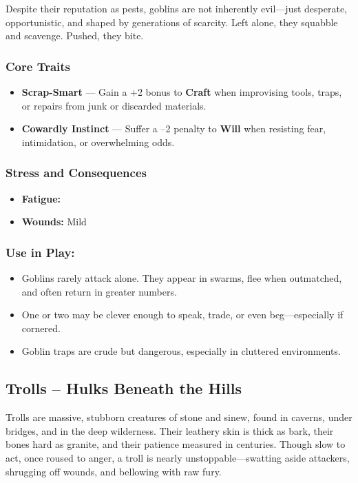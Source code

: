Despite their reputation as pests, goblins are not inherently evil—just desperate, opportunistic, and shaped by generations of scarcity. Left alone, they squabble and scavenge. Pushed, they bite.

\subsubsection*{Core Traits}
\begin{itemize}
  \item \textbf{Scrap-Smart} — Gain a +2 bonus to \textbf{Craft} when improvising tools, traps, or repairs from junk or discarded materials.

  \item \textbf{Cowardly Instinct} — Suffer a –2 penalty to \textbf{Will} when resisting fear, intimidation, or overwhelming odds.
\end{itemize}

\subsubsection*{Stress and Consequences}
\begin{itemize}
  \item \textbf{Fatigue:} \FatigueBox\FatigueBox
  \item \textbf{Wounds:} Mild \MildWound\MildWound
\end{itemize}

\subsubsection*{Use in Play:}
\begin{itemize}
  \item Goblins rarely attack alone. They appear in swarms, flee when outmatched, and often return in greater numbers.
  \item One or two may be clever enough to speak, trade, or even beg—especially if cornered.
  \item Goblin traps are crude but dangerous, especially in cluttered environments.
\end{itemize}


\subsection*{Trolls – Hulks Beneath the Hills}

Trolls are massive, stubborn creatures of stone and sinew, found in caverns, under bridges, and in the deep wilderness. Their leathery skin is thick as bark, their bones hard as granite, and their patience measured in centuries. Though slow to act, once roused to anger, a troll is nearly unstoppable—swatting aside attackers, shrugging off wounds, and bellowing with raw fury.

